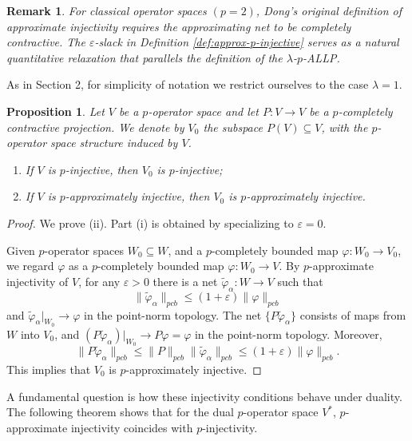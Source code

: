\documentclass[12pt]{article}
\newtheorem{proposition}[theorem]{Proposition}
\newtheorem{remark}[theorem]{Remark}
\newcommand{\pcb}{pcb}
\begin{document}
\begin{remark}
For classical operator spaces $(p=2)$, Dong's original definition of approximate injectivity \cite{Dong2007} requires the approximating net to be completely contractive. The $\varepsilon$-slack in Definition \ref{def:approx-p-injective} serves as a natural quantitative relaxation that parallels the definition of the $\lambda$-$p$-ALLP.
\end{remark}

As in Section 2,  for simplicity of notation we restrict ourselves to the case $\lambda=1$.

\begin{proposition}\label{prop:proj-injective}
Let $V$ be a $p$-operator space and let $P:V\to V$ be a $p$-completely contractive
projection.  We denote by $V_0$ the subspace $P(V)\subseteq V$, with the
$p$-operator space structure induced by $V$.
\begin{enumerate}
        \item[\rm(i)] If $V$ is $p$-injective, then $V_0$ is
                $p$-injective;
        \item[\rm(ii)] If $V$ is $p$-approximately injective, then $V_0$
                is $p$-approximately injective.
\end{enumerate}

\end{proposition}

\begin{proof}
We prove (ii). Part (i) is obtained by specializing to $\varepsilon=0$.

Given $p$-operator spaces $W_0\subseteq W$, and a $p$-completely bounded map $\varphi:W_0\to V_0$, we regard $\varphi$ as a
$p$-completely bounded map $\varphi:W_0\to V$.  By $p$-approximate injectivity of $V$,
for any $\varepsilon>0$ there is a net
$\widetilde{\varphi}_\alpha:W\to V$ such that
\[
        \|\widetilde{\varphi}_\alpha\|_{\pcb}
        \leq(1+\varepsilon)\|\varphi\|_{\pcb}
\]
and $\widetilde{\varphi}_\alpha|_{W_0}\to\varphi$ in the point-norm topology.
The net $\{P\widetilde{\varphi}_\alpha\}$ consists of maps from $W$ into $V_0$,
and $(P\widetilde{\varphi}_\alpha)|_{W_0}\to P\varphi=\varphi$ in the
point-norm topology.  Moreover,
\[
        \|P\widetilde{\varphi}_\alpha\|_{\pcb}
        \leq \|P\|_{\pcb}\|\widetilde{\varphi}_\alpha\|_{\pcb}
        \leq (1+\varepsilon)\|\varphi\|_{\pcb}.
\]
This implies that $V_{0}$ is $p$-approximately injective.
\end{proof}

A fundamental question is how these injectivity conditions behave under duality. The following theorem shows that for the dual $p$-operator space $V^*$, $p$-approximate injectivity coincides with $p$-injectivity.
\end{document}
